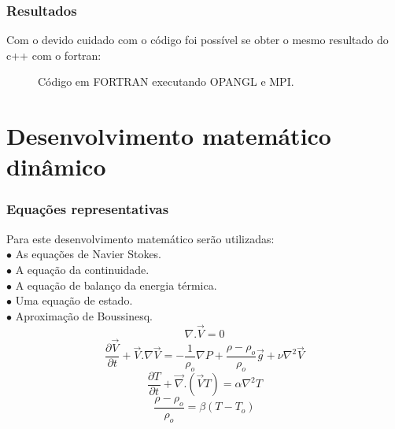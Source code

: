 \documentclass[xcolor=dvipsnames,10pt,aspectratio=169]{beamer}
\begin{document}
	\begin{frame}
		\frametitle{Resultados}

		\begin{minipage}[h!]{0.45\textwidth}
	 		Com o devido cuidado com o código foi possível se obter o mesmo resultado do c++ com o fortran:
	 	\end{minipage}\hfill
 		\begin{minipage}[h!]{0.5\textwidth}
	 		\begin{figure}
	 			\label{gif_gfort}
	 			\caption{Código em FORTRAN executando OPANGL e MPI.}
	 		\end{figure}
	 	\end{minipage}
	\end{frame}




\section{Desenvolvimento matemático dinâmico}

	\begin{frame}
		\frametitle{Equações representativas}
		\flushleft
		Para este desenvolvimento matemático serão utilizadas:\\
		\quad $\bullet$ As equações de Navier Stokes.\\
		\quad $\bullet$ A equação da continuidade.\\
		\quad $\bullet$ A equação de balanço da energia térmica.\\
		\quad $\bullet$ Uma equação de estado.\\
		\quad $\bullet$ Aproximação de Boussinesq.\\

		\begin{equation}
		\nabla . \vec{V} = 0
		\end{equation}
		\begin{equation}
		\frac{\partial \vec{V}}{\partial t} +  \vec{V} . {\nabla} \vec{V}  =  -\frac{1}{\rho_o} {\nabla}P + \frac{\rho - \rho_o}{\rho_o} \vec{g} + \nu \nabla ^2 \vec{V}
		\end{equation}
		\begin{equation}
		\frac{\partial T}{\partial t} + \vec{\nabla} . \left( \vec{V}T \right) = \alpha \nabla^2T
		\end{equation}
		\begin{equation}
		\frac{\rho - \rho_o}{\rho_o} = \beta \left( T - T_o\right)
		\end{equation}

	\end{frame}
\end{document}
